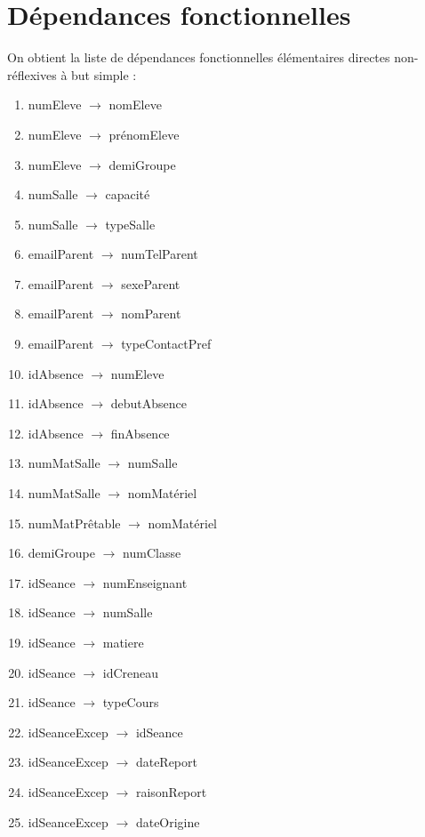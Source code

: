 \documentclass[12pt,french,titlepage]{article}
\begin{document}
	  \section{Dépendances fonctionnelles}
	  
	  On obtient la liste de dépendances fonctionnelles  élémentaires directes non-réflexives à but
      simple :
      
      \begin{enumerate}
          \item numEleve $\rightarrow$ nomEleve  
\item	numEleve $\rightarrow$ prénomEleve   
\item numEleve	$\rightarrow$ demiGroupe   

\item numSalle $\rightarrow$ capacité    
\item	numSalle $\rightarrow$ typeSalle   

\item emailParent $\rightarrow$ numTelParent   
\item	   emailParent $\rightarrow$ sexeParent    
\item	   emailParent $\rightarrow$ nomParent	   
\item emailParent $\rightarrow$ typeContactPref   

\item idAbsence $\rightarrow$ numEleve    
\item	 idAbsence $\rightarrow$ debutAbsence   
\item	 idAbsence $\rightarrow$ finAbsence  

\item numMatSalle $\rightarrow$ numSalle   
	\item   numMatSalle $\rightarrow$ nomMatériel 

\item numMatPrêtable $\rightarrow$ nomMatériel

\item demiGroupe $\rightarrow$ numClasse   

\item idSeance $\rightarrow$ numEnseignant   
\item	idSeance $\rightarrow$ numSalle    
\item	idSeance $\rightarrow$ matiere    
\item	idSeance $\rightarrow$ idCreneau   
\item	idSeance $\rightarrow$ typeCours    

\item idSeanceExcep $\rightarrow$ idSeance   
\item	     idSeanceExcep $\rightarrow$ dateReport   
\item	     idSeanceExcep $\rightarrow$ raisonReport   
\item	     idSeanceExcep $\rightarrow$ dateOrigine    


\end{enumerate}
\end{document}
